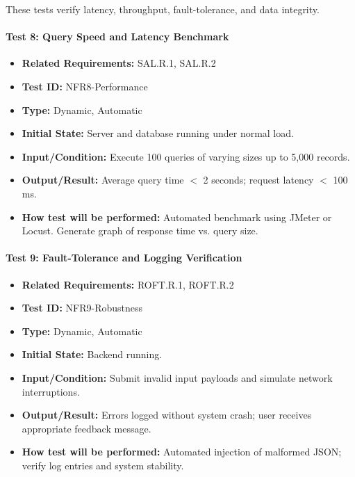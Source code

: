 \documentclass[12pt, titlepage]{article}
\begin{document}
These tests verify latency, throughput, fault-tolerance, and data integrity.

\paragraph{Test 8: Query Speed and Latency Benchmark}
\begin{itemize}
    \item \textbf{Related Requirements:} SAL.R.1, SAL.R.2
    \item \textbf{Test ID:} NFR8-Performance
    \item \textbf{Type:} Dynamic, Automatic
    \item \textbf{Initial State:} Server and database running under normal load.
    \item \textbf{Input/Condition:} Execute 100 queries of varying sizes up to 5,000 records.
    \item \textbf{Output/Result:} Average query time $<$ 2 seconds; request latency $<$ 100 ms.
    \item \textbf{How test will be performed:} Automated benchmark using JMeter or Locust. Generate graph of response time vs. query size.
\end{itemize}

\paragraph{Test 9: Fault-Tolerance and Logging Verification}
\begin{itemize}
    \item \textbf{Related Requirements:} ROFT.R.1, ROFT.R.2
    \item \textbf{Test ID:} NFR9-Robustness
    \item \textbf{Type:} Dynamic, Automatic
    \item \textbf{Initial State:} Backend running.
    \item \textbf{Input/Condition:} Submit invalid input payloads and simulate network interruptions.
    \item \textbf{Output/Result:} Errors logged without system crash; user receives appropriate feedback message.
    \item \textbf{How test will be performed:} Automated injection of malformed JSON; verify log entries and system stability.
\end{itemize}
\end{document}
